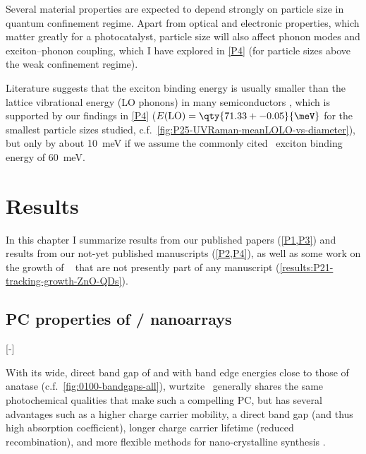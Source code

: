 \documentclass[webedition,openright,titles,swedish,english]{LuaUUThesis}\usepackage[]{graphicx}\usepackage[]{xcolor}
\newcommand{\cf}{c.f.}
\begin{document}
Several material properties are expected to depend strongly on particle size
in quantum confinement regime.
Apart from optical and electronic properties, which matter greatly for a
photocatalyst, particle size will also affect phonon modes and exciton--phonon coupling,
which I have explored in \cref{P4} (for particle sizes above the weak confinement regime).


Literature suggests that the exciton binding energy is usually smaller than the
lattice vibrational energy (LO phonons) in many semiconductors \cite{Adachi1999a},
which is supported by our findings in \cref{P4} ($E(\mathrm{LO})=\qty{71.33+-0.05}{\meV}$
for the smallest particle sizes studied, \cf\ \cref{fig:P25-UVRaman-meanLOLO-vs-diameter}),
but only by about \qty{10}{\meV} if we assume the commonly cited \ZnO\ exciton binding energy
of \qty{60}{\meV}.





\chapter[Results]{Results}
\label{ch:results}

In this chapter I summarize results from our published papers (\cref{P1,P3})
and results from our not-yet published manuscripts (\cref{P2,P4}), as well
as some work on the growth of \ZnO\  that are not presently part
of any manuscript (\cref{results:P21-tracking-growth-ZnO-QDs}).



%

%

%

\section[PC properties of ZnO/CdS nanoarrays]{\texorpdfstring{PC properties of \ZnO/ nanoarrays}{PC properties of ZnO/CdS nanoarrays}}
\label{results:P01-ZnO-CdS-nanoarrays}
[-\baselineskip]

With its wide, direct band gap of  and with band edge energies close to
those of  anatase (\cf\ \cref{fig:0100-bandgaps-all}), wurtzite \ZnO\
generally shares the same photochemical qualities that make  such a compelling \gls{PC},
but has several advantages such as a higher charge carrier mobility, a direct band gap
(and thus high absorption coefficient),
longer charge carrier lifetime (reduced recombination), and more flexible methods
for nano-crystalline synthesis \cite{Quintana2007,Ozgur2005}.
\end{document}
